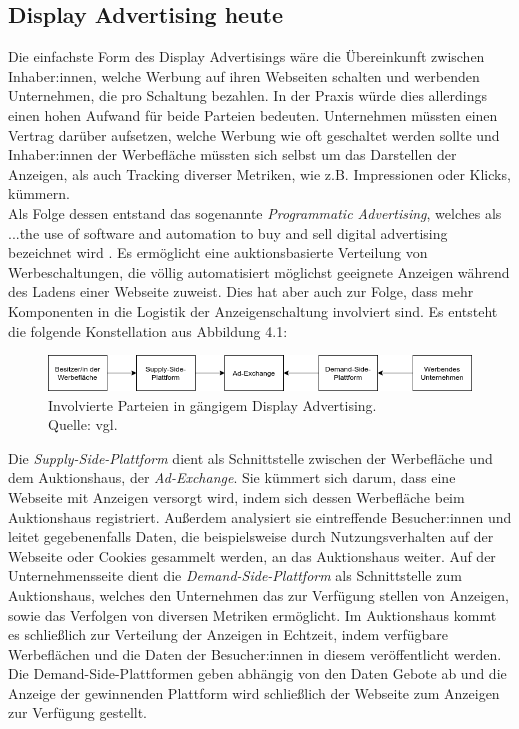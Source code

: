 \subsection{Display Advertising heute}
Die einfachste Form des Display Advertisings wäre die Übereinkunft zwischen Inhaber:innen, welche Werbung auf ihren Webseiten schalten und werbenden Unternehmen, die pro Schaltung bezahlen. In der Praxis würde dies allerdings einen hohen Aufwand für beide Parteien bedeuten. Unternehmen müssten einen Vertrag darüber aufsetzen, welche Werbung wie oft geschaltet werden sollte und Inhaber:innen der Werbefläche müssten sich selbst um das Darstellen der Anzeigen, als auch Tracking diverser Metriken, wie z.B. Impressionen oder Klicks, kümmern.\\

Als Folge dessen entstand das sogenannte \emph{Programmatic Advertising}, welches als \glqq...the use of software and automation to buy and sell digital advertising\grqq{} bezeichnet wird \cite[S. 4]{optimity_advisors_2019}. Es ermöglicht eine auktionsbasierte Verteilung von Werbeschaltungen, die völlig automatisiert möglichst geeignete Anzeigen während des Ladens einer Webseite zuweist. Dies hat aber auch zur Folge, dass mehr Komponenten in die Logistik der Anzeigenschaltung involviert sind. Es entsteht die folgende Konstellation aus Abbildung 4.1:

\begin{figure}[htpb]
	\centering
	\includegraphics[width=\textwidth]{images/programmatic_advertising.png}
	\caption{Involvierte Parteien in gängigem Display Advertising.\\
	Quelle: vgl. \cite[S. 9]{optimity_advisors_2019}}
	\label{6braun:fig:programmatic_advertising}
\end{figure}
Die \emph{Supply-Side-Plattform} dient als Schnittstelle zwischen der Werbefläche und dem Auktionshaus, der \emph{Ad-Exchange}. Sie kümmert sich darum, dass eine Webseite mit Anzeigen versorgt wird, indem sich dessen Werbefläche beim Auktionshaus registriert. Außerdem analysiert sie eintreffende Besucher:innen und leitet gegebenenfalls Daten, die beispielsweise durch Nutzungsverhalten auf der Webseite oder Cookies gesammelt werden, an das Auktionshaus weiter. Auf der Unternehmensseite dient die \emph{Demand-Side-Plattform} als Schnittstelle zum Auktionshaus, welches den Unternehmen das zur Verfügung stellen von Anzeigen, sowie das Verfolgen von diversen Metriken ermöglicht. Im Auktionshaus kommt es schließlich zur Verteilung der Anzeigen in Echtzeit, indem verfügbare Werbeflächen und die Daten der Besucher:innen in diesem veröffentlicht werden. Die Demand-Side-Plattformen geben abhängig von den Daten Gebote ab und die Anzeige der gewinnenden Plattform wird schließlich der Webseite zum Anzeigen zur Verfügung gestellt.\\

